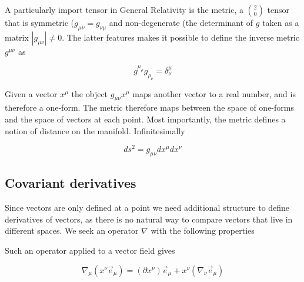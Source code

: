 A particularly import tensor in General Relativity is the metric, a
${2 \choose 0}$ tensor that is symmetric ($g_{\mu\nu} = g_{\nu\mu}$
and non-degenerate (the determinant of $g$ taken as a matrix 
$|g_{\mu\nu}| \neq 0$.  The latter features makes it possible to
define the inverse metric $g^{\mu\nu}$ as

\begin{equation*}
g^{\mu_\rho} g_{\rho_\nu} = \delta^\mu_\nu
\end{equation*}

Given a vector $x^\mu$ the object $g_{\mu\nu} x^\mu$ maps another
vector to a real number, and is therefore a one-form.  The metric
therefore maps between the space of one-forms and the space of vectors
at each point.  Most importantly, the metric defines a notion of
distance on the manifold.  Infinitesimally

\begin{equation}
ds^2 = g_{\mu\nu} dx^\mu dx^\nu
\end{equation}



\subsection{Covariant derivatives}

Since vectors are only defined at a point we need additional structure
to define derivatives of vectors, as there is no natural way to
compare vectors that live in different spaces.  We seek an operator
$\nabla$ with the following properties

\iffalse
\begin{list}
\item Maps ${m \choose n}$ tensors to ${m \choose {n+1}}$ tensors.
This is so we may consider the directional derivative of a tensor $T$
along a vector $x$ as $x^\mu \nabla_\mu T$.
\item Reduces to partial differentiation when applies to a scalar
field.
\item Linear.
\item Satisfies the Leibniz rule, $\nabla(a b) = a\nabla b + b \nabla a$.
\end{list}
\fi

Such an operator applied to a vector field gives

\begin{equation*}
\nabla_\mu (x^\nu \vec{e}_\mu)
= (\partial x^\nu) \vec{e}_\mu + x^\nu (\nabla_\nu \vec{e}_\mu)
\end{equation*}

